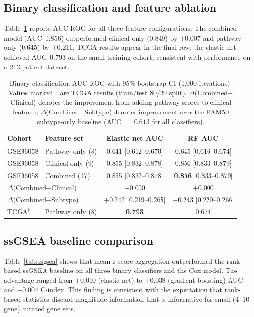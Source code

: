 \documentclass[review,12pt]{elsarticle}
\begin{document}
\subsection{Binary classification and feature ablation}
\label{sec:res_classification}

Table~\ref{tab:auc} reports AUC-ROC for all three feature configurations.
The combined model (AUC~0.856) outperformed clinical-only (0.849) by
$+$0.007 and pathway-only (0.645) by $+$0.211.  TCGA results appear in
the final row; the elastic net achieved AUC~0.793 on the small training
cohort, consistent with performance on a 213-patient dataset.

\begin{table}[!ht]
\centering
\caption{Binary classification AUC-ROC with 95\% bootstrap CI
  (1{,}000 iterations).  Values marked $\dagger$ are TCGA results
  (train/test 80/20 split).  $\Delta$(Combined$-$Clinical) denotes
  the improvement from adding pathway scores to clinical features;
  $\Delta$(Combined$-$Subtype) denotes improvement over the
  PAM50 subtype-only baseline (AUC~$= 0.613$ for all classifiers).}
\label{tab:auc}
\footnotesize
\begin{tabular}{llcc}
\toprule
\textbf{Cohort} & \textbf{Feature set} &
  \textbf{Elastic net AUC} & \textbf{RF AUC} \\
\midrule
GSE96058 & Pathway only (8)  & 0.641 [0.612--0.670] & 0.645 [0.616--0.674] \\
GSE96058 & Clinical only (9)  & 0.855 [0.832--0.878] & 0.856 [0.833--0.879] \\
GSE96058 & Combined (17)  & 0.855 [0.832--0.878] & \textbf{0.856} [0.833--0.879] \\
\multicolumn{2}{l}{\quad $\Delta$(Combined$-$Clinical)} & $+$0.000 & $+$0.000 \\
\multicolumn{2}{l}{\quad $\Delta$(Combined$-$Subtype)} & $+$0.242 [0.219--0.265] & $+$0.243 [0.220--0.266] \\
TCGA$^\dagger$ & Pathway only (8) & \textbf{0.793} & 0.674 \\
\bottomrule
\end{tabular}
\end{table}

\subsection{ssGSEA baseline comparison}
\label{sec:res_ssgsea}

Table~\ref{tab:ssgsea} shows that mean z-score aggregation outperformed
the rank-based ssGSEA baseline on all three binary classifiers and the
Cox model.  The advantage ranged from $+$0.010 (elastic net) to $+$0.038
(gradient boosting) AUC and $+$0.004 C-index.  This finding is consistent
with the expectation that rank-based statistics discard magnitude
information that is informative for small (4--10 gene) curated gene sets.
\end{document}
